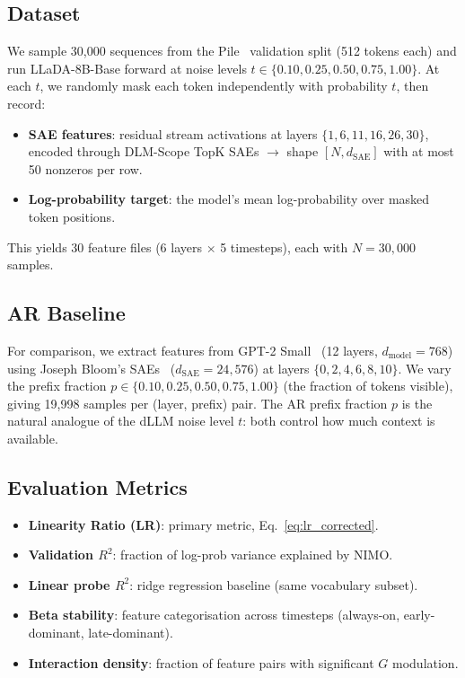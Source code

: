 \documentclass{article}
\begin{document}
\subsection{Dataset}

We sample 30,000 sequences from the Pile~\citep{gao2020pile} validation split (512 tokens each) and run LLaDA-8B-Base forward at noise levels $t \in \{0.10, 0.25, 0.50, 0.75, 1.00\}$.
At each $t$, we randomly mask each token independently with probability $t$, then record:
\begin{itemize}
    \item \textbf{SAE features}: residual stream activations at layers $\{1, 6, 11, 16, 26, 30\}$, encoded through DLM-Scope TopK SAEs $\to$ shape $[N, d_\mathrm{SAE}]$ with at most 50 nonzeros per row.
    \item \textbf{Log-probability target}: the model's mean log-probability over masked token positions.
\end{itemize}
This yields 30 feature files (6 layers $\times$ 5 timesteps), each with $N = 30{,}000$ samples.

\subsection{AR Baseline}

For comparison, we extract features from GPT-2 Small~\citep{radford2019language} (12 layers, $d_\mathrm{model} = 768$) using Joseph Bloom's SAEs~\citep{bloom2024sae} ($d_\mathrm{SAE} = 24{,}576$) at layers $\{0, 2, 4, 6, 8, 10\}$.
We vary the prefix fraction $p \in \{0.10, 0.25, 0.50, 0.75, 1.00\}$ (the fraction of tokens visible), giving 19,998 samples per (layer, prefix) pair.
The AR prefix fraction $p$ is the natural analogue of the dLLM noise level $t$: both control how much context is available.

\subsection{Evaluation Metrics}

\begin{itemize}
    \item \textbf{Linearity Ratio (LR)}: primary metric, Eq.~\eqref{eq:lr_corrected}.
    \item \textbf{Validation $R^2$}: fraction of log-prob variance explained by NIMO.
    \item \textbf{Linear probe $R^2$}: ridge regression baseline (same vocabulary subset).
    \item \textbf{Beta stability}: feature categorisation across timesteps (always-on, early-dominant, late-dominant).
    \item \textbf{Interaction density}: fraction of feature pairs with significant $G$ modulation.
\end{itemize}
\end{document}
